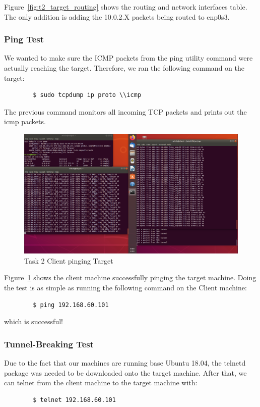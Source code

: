 \documentclass[12pt]{article}
\begin{document}
    Figure~\ref{fig:t2_target_routing} shows the routing and network interfaces table. The only addition is adding the 10.0.2.X packets being routed to enp0s3.

\subsubsection{Ping Test}
    We wanted to make sure the ICMP packets from the ping utility command were actually reaching the target. Therefore, we ran the following command on the target:
    \begin{verbatim}
        $ sudo tcpdump ip proto \\icmp
    \end{verbatim}
    The previous command monitors all incoming TCP packets and prints out the icmp packets.

    \begin{figure}[H]
        \begin{center}
            \includegraphics[scale=0.25]{t2_successful_ping.png}
        \end{center}{}
        \caption{Task 2 Client pinging Target}
        \label{fig:t2_successful_ping}
    \end{figure}
    
    Figure~\ref{fig:t2_successful_ping} shows the client machine successfully pinging the target machine. Doing the test is as simple as running the following command on the Client machine:
    
    \begin{verbatim}
        $ ping 192.168.60.101
    \end{verbatim}

    which is successful!
\subsubsection{Tunnel-Breaking Test}
    Due to the fact that our machines are running base Ubuntu 18.04, the telnetd package was needed to be downloaded onto the target machine. After that, we can telnet from the client machine to the target machine with:
    \begin{verbatim}
        $ telnet 192.168.60.101
    \end{verbatim}
\end{document}

